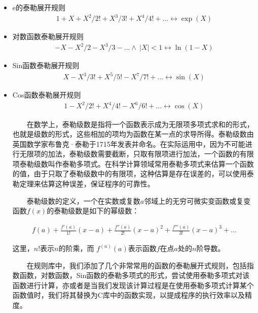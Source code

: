 \begin{itemize}

  \item {\kaishu e的泰勒展开规则} 
  \begin{gather*}
  1 + X + X^2 / 2! + X^3 / 3! + X^4 / 4! + ... \longleftrightarrow \exp(X)
  \end{gather*}

  \item {\kaishu 对数函数泰勒展开规则} 
  \begin{gather*}
  - X - X^2 / 2 - X^3 / 3 - ... \wedge\ \left|X\right| < 1 \longleftrightarrow  \ln(1-X)
  \end{gather*}

  \item {\kaishu Sin函数泰勒展开规则} 
  \begin{gather*}
  X - X^3/3! + X^5/5! - X^7/7! + ... \longleftrightarrow  \sin(X)
  \end{gather*}

  \item {\kaishu Cos函数泰勒展开规则} 
  \begin{gather*}
  1 - X^2/2! + X^4/4! - X^6/6! + ... \longleftrightarrow  \cos(X)
  \end{gather*}

  　　在数学上，泰勒级数是指将一个函数表示成为无限项多项式求和的形式，也就是级数的形式，这些相加的项均为函数在某一点的求导所得。泰勒级数由英国数学家布鲁克·泰勒于1715年发表并命名。在实际运用中，因为不可能进行无限项的加法，泰勒级数需要截断，只取有限项进行加法，一个函数的有限项泰勒级数叫作泰勒多项式。在科学计算领域常用泰勒多项式来估算一个函数的值，由于只取了泰勒级数中的有限项，这种估算是存在误差的，可以使用泰勒定理来估算这种误差，保证程序的可靠性。

  　　泰勒级数的定义，一个在实数或复数$a$邻域上的无穷可微实变函数或复变函数$f(x)$的泰勒级数是如下的幂级数：

  \begin{gather*}
    f(a)+\frac{f'(a)}{1!}(x-a)+\frac{f''(a)}{2!}(x-a)^2+\frac{f'''(a)}{3!}(x-a)^3+...
  \end{gather*}

  这里，$n!$表示$n$的阶乘，而 ${f^{(n)}(a)}$表示函数$f$在点$a$处的$n$阶导数。


  　　在规则库中，我们添加了几个非常常用的函数的泰勒展开式规则，包括指数函数，对数函数，Sin函数的泰勒多项式的形式，尝试使用泰勒多项式对该函数进行计算，亦或者是当我们发现该计算过程是在使用泰勒多项式计算某个函数值时，我们将其替换为C库中的函数实现，以提成程序的执行效率以及精度。

\end{itemize}

